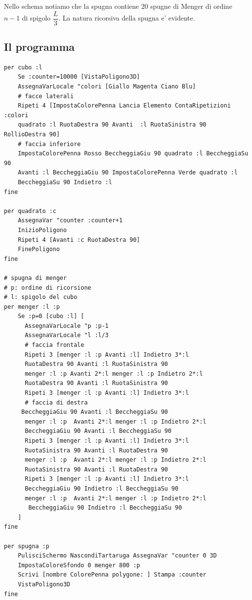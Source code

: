 Nello schema notiamo che la spugna contiene 20 spugne di Menger di ordine $n-1$ di spigolo $\dfrac{L}{3}$. La natura ricorsiva della spugna e' evidente.\\

\subsection{Il programma}

\begin{lstlisting}[frame=single]
per cubo :l
	Se :counter=10000 [VistaPoligono3D]
	AssegnaVarLocale "colori [Giallo Magenta Ciano Blu]
	# facce laterali
	Ripeti 4 [ImpostaColorePenna Lancia Elemento ContaRipetizioni :colori 
	quadrato :l RuotaDestra 90 Avanti  :l RuotaSinistra 90 RollioDestra 90]
	# faccia inferiore
	ImpostaColorePenna Rosso BeccheggiaGiu 90 quadrato :l BeccheggiaSu 90
	Avanti :l BeccheggiaGiu 90 ImpostaColorePenna Verde quadrato :l 
	BeccheggiaSu 90 Indietro :l
fine

per quadrato :c
	AssegnaVar "counter :counter+1
	InizioPoligono
	Ripeti 4 [Avanti :c RuotaDestra 90]
	FinePoligono
fine

# spugna di menger
# p: ordine di ricorsione
# l: spigolo del cubo
per menger :l :p
	Se :p=0 [cubo :l] [
	  AssegnaVarLocale "p :p-1  
	  AssegnaVarLocale "l :l/3
	  # faccia frontale
	  Ripeti 3 [menger :l :p Avanti :l] Indietro 3*:l
	  RuotaDestra 90 Avanti :l RuotaSinistra 90
	  menger :l :p Avanti 2*:l menger :l :p Indietro 2*:l
	  RuotaDestra 90 Avanti :l RuotaSinistra 90
	  Ripeti 3 [menger :l :p Avanti :l] Indietro 3*:l
	  # faccia di destra
	 BeccheggiaGiu 90 Avanti :l BeccheggiaSu 90 
	  menger :l :p  Avanti 2*:l menger :l :p Indietro 2*:l
	  BeccheggiaGiu 90 Avanti :l BeccheggiaSu 90 
	  Ripeti 3 [menger :l :p Avanti :l] Indietro 3*:l
	  RuotaSinistra 90 Avanti :l RuotaDestra 90
	  menger :l :p  Avanti 2*:l menger :l :p Indietro 2*:l
	  RuotaSinistra 90 Avanti :l RuotaDestra 90
	  Ripeti 3 [menger :l :p Avanti :l] Indietro 3*:l
	  BeccheggiaGiu 90 Indietro :l BeccheggiaSu 90
	  menger :l :p  Avanti 2*:l menger :l :p Indietro 2*:l
	   BeccheggiaGiu 90 Indietro :l BeccheggiaSu 90
	]
fine

per spugna :p
	PulisciSchermo NascondiTartaruga AssegnaVar "counter 0 3D 
	ImpostaColoreSfondo 0 menger 800 :p 
	Scrivi [nombre ColorePenna polygone: ] Stampa :counter 
	VistaPoligono3D
fine
\end{lstlisting}

